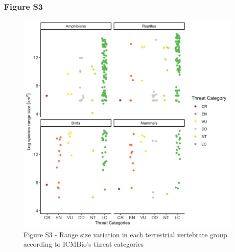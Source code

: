 \documentclass[12pt,openright,oneside,a4paper,english]{abntex2}
\begin{document}
\subsubsection*{Figure S3}\label{fig:fig1-s3}
\begin{figure}[H]
	\centering
	\includegraphics[width=160mm]{Fig c1-s3}
	\caption*{\small Figure S3 - Range size variation in each terrestrial vertebrate group according to ICMBio’s threat categories}
\end{figure}

\pagebreak
\end{document}
